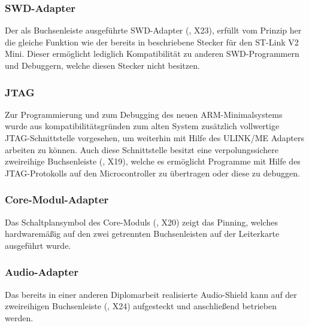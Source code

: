 
\subsubsection{SWD-Adapter}
Der als Buchsenleiste ausgeführte SWD-Adapter (, X23), erfüllt vom Prinzip her die gleiche Funktion wie der bereits in  beschriebene Stecker für den ST-Link V2 Mini. Dieser ermöglicht lediglich Kompatibilität zu anderen SWD-Programmern und Debuggern, welche diesen Stecker nicht besitzen.


\subsubsection{JTAG}
Zur Programmierung und zum \gls{Debugging} des neuen \gls{ARM}-\gls{Minimalsystem}s wurde aus kompatibilitätsgründen zum alten System zusätzlich vollwertige JTAG-Schnittstelle vorgesehen, um weiterhin mit Hilfe des ULINK/ME Adapters arbeiten zu können. Auch diese Schnittstelle besitzt eine verpolungssichere zweireihige Buchsenleiste (, X19), welche es ermöglicht Programme mit Hilfe des JTAG-Protokolls auf den Microcontroller zu übertragen oder diese zu debuggen.


\subsubsection{Core-Modul-Adapter}
Das Schaltplansymbol des \gls{Core-Modul}s (, X20) zeigt das Pinning, welches hardwaremäßig auf den zwei getrennten Buchsenleisten auf der Leiterkarte ausgeführt wurde.


\subsubsection{Audio-Adapter}
Das bereits in einer anderen Diplomarbeit realisierte Audio-Shield kann auf der zweireihigen Buchsenleiste (, X24) aufgesteckt und anschließend betrieben werden.

